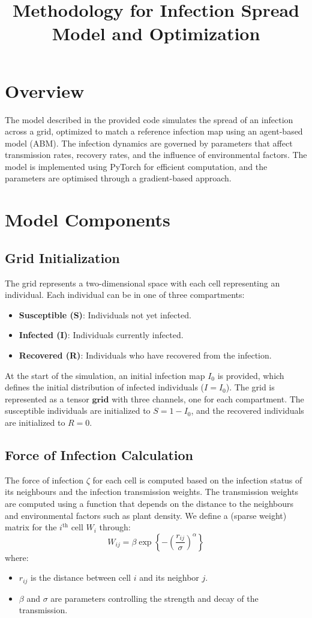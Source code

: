 \documentclass[12pt]{article}
\title{Methodology for Infection Spread Model and Optimization}
\author{}
\date{}
\begin{document}
\maketitle

\section{Overview}
The model described in the provided code simulates the spread of an infection across a grid, optimized to match a reference infection map using an agent-based model (ABM). The infection dynamics are governed by parameters that affect transmission rates, recovery rates, and the influence of environmental factors. The model is implemented using PyTorch for efficient computation, and the parameters are optimised through a gradient-based approach.

\section{Model Components}
\subsection{Grid Initialization}
The grid represents a two-dimensional space with each cell representing an individual. Each individual can be in one of three compartments:
\begin{itemize}
    \item \textbf{Susceptible (S)}: Individuals not yet infected.
    \item \textbf{Infected (I)}: Individuals currently infected.
    \item \textbf{Recovered (R)}: Individuals who have recovered from the infection.
\end{itemize}
At the start of the simulation, an initial infection map $I_0$ is provided, which defines the initial distribution of infected individuals ($I=I_0$). The grid is represented as a tensor $\mathbf{grid}$ with three channels, one for each compartment. The susceptible individuals are initialized to $S = 1 - I_0$, and the recovered individuals are initialized to $R = 0$.

\subsection{Force of Infection Calculation}
The force of infection $\zeta$ for each cell is computed based on the infection status of its neighbours and the infection transmission weights. The transmission weights are computed using a function that depends on the distance to the neighbours and environmental factors such as plant density. We define a (sparse weight) matrix for the $i^{\textrm{th}}$ cell $W_i$ through:
\[
W_{ij} = \beta \exp\left\{ - \left (\frac{r_{ij}}{\sigma} \right)^\alpha \right\}
\]
where:
\begin{itemize}
    \item $r_{ij}$ is the distance between cell $i$ and its neighbor $j$.
    \item $\beta$ and $\sigma$ are parameters controlling the strength and decay of the transmission.
\end{itemize}
\end{document}
